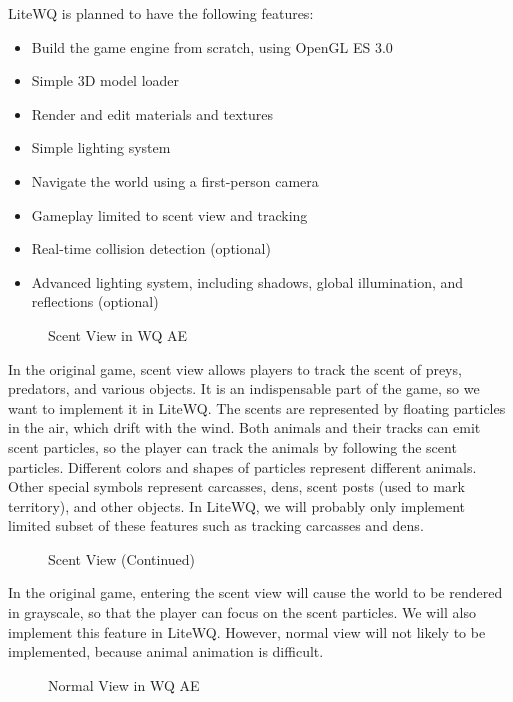 \documentclass[a4paper]{article}
\providecommand{\tightlist}{%
  \setlength{\itemsep}{0pt}\setlength{\parskip}{0pt}}
\newcommand{\includegraphicx}[1]{\maxsizebox{\textwidth}{\textheight}{\texttt{[image: \#1]}}}
\begin{document}
LiteWQ is planned to have the following features:

\begin{itemize}
\tightlist
\item
  Build the game engine from scratch, using OpenGL ES 3.0
\item
  Simple 3D model loader
\item
  Render and edit materials and textures
\item
  Simple lighting system
\item
  Navigate the world using a first-person camera
\item
  Gameplay limited to scent view and tracking
\item
  Real-time collision detection (optional)
\item
  Advanced lighting system, including shadows, global illumination, and
  reflections (optional)
\end{itemize}

\begin{figure}[H]
\centering
\includegraphicx{img/scent.png}
\caption{Scent View in WQ AE}
\end{figure}

In the original game, scent view allows players to track the scent of
preys, predators, and various objects. It is an indispensable part of
the game, so we want to implement it in LiteWQ. The scents are
represented by floating particles in the air, which drift with the wind.
Both animals and their tracks can emit scent particles, so the player
can track the animals by following the scent particles. Different colors
and shapes of particles represent different animals. Other special
symbols represent carcasses, dens, scent posts (used to mark territory),
and other objects. In LiteWQ, we will probably only implement limited
subset of these features such as tracking carcasses and dens.

\begin{figure}[H]
\centering
\includegraphicx{img/animal_track.png}
\caption{Scent View (Continued)}
\end{figure}

In the original game, entering the scent view will cause the world to be
rendered in grayscale, so that the player can focus on the scent
particles. We will also implement this feature in LiteWQ. However,
normal view will not likely to be implemented, because animal animation
is difficult.

\begin{figure}[H]
\centering
\includegraphicx{img/normal.png}
\caption{Normal View in WQ AE}
\end{figure}
\end{document}
